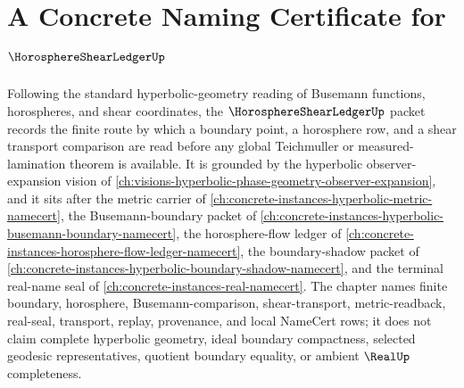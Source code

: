 \chapter{A Concrete Naming Certificate for $\HorosphereShearLedgerUp$}
\label{ch:concrete-instances-horosphere-shear-ledger-namecert}

Following the standard hyperbolic-geometry reading of Busemann functions, horospheres, and shear coordinates, the $\HorosphereShearLedgerUp$ packet records the finite route by which a boundary point, a horosphere row, and a shear transport comparison are read before any global Teichmuller or measured-lamination theorem is available. It is grounded by the hyperbolic observer-expansion vision of \autoref{ch:visions-hyperbolic-phase-geometry-observer-expansion}, and it sits after the metric carrier of \autoref{ch:concrete-instances-hyperbolic-metric-namecert}, the Busemann-boundary packet of \autoref{ch:concrete-instances-hyperbolic-busemann-boundary-namecert}, the horosphere-flow ledger of \autoref{ch:concrete-instances-horosphere-flow-ledger-namecert}, the boundary-shadow packet of \autoref{ch:concrete-instances-hyperbolic-boundary-shadow-namecert}, and the terminal real-name seal of \autoref{ch:concrete-instances-real-namecert}. The chapter names finite boundary, horosphere, Busemann-comparison, shear-transport, metric-readback, real-seal, transport, replay, provenance, and local NameCert rows; it does not claim complete hyperbolic geometry, ideal boundary compactness, selected geodesic representatives, quotient boundary equality, or ambient $\RealUp$ completeness.

